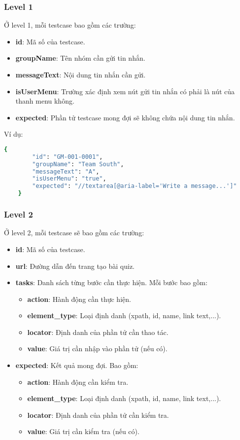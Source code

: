 \subsubsection{Level 1}
Ở level 1, mỗi testcase bao gồm các trường:
\begin{itemize}
    \item \textbf{id}: Mã số của testcase.
    \item \textbf{groupName}: Tên nhóm cần gửi tin nhắn.
    \item \textbf{messageText}: Nội dung tin nhắn cần gửi.
    \item \textbf{isUserMenu}: Trường xác định xem nút gửi tin nhắn có phải là nút của thanh menu không.
    \item \textbf{expected}: Phần tử testcase mong đợi sẽ không chứa nội dung tin nhắn.
\end{itemize}

Ví dụ:
\begin{lstlisting}[language=bash, caption={Ví dụ testcase GM-001-0001 ở level 1}, breaklines=true]
    {
        "id": "GM-001-0001",
        "groupName": "Team South",
        "messageText": "A",
        "isUserMenu": "true",
        "expected": "//textarea[@aria-label='Write a message...']"
    }
\end{lstlisting}

\subsubsection{Level 2}

Ở level 2, mỗi testcase sẽ bao gồm các trường:
\begin{itemize}
    \item \textbf{id}: Mã số của testcase.
    \item \textbf{url}: Đường dẫn đến trang tạo bài quiz.
    \item \textbf{tasks}: Danh sách từng bước cần thực hiện. Mỗi bước bao gồm:
\begin{itemize}
    \item \textbf{action}: Hành động cần thực hiện.
    \item \textbf{element\_type}: Loại định danh (xpath, id, name, link text,...).
    \item \textbf{locator}: Định danh của phần tử cần thao tác.
    \item \textbf{value}: Giá trị cần nhập vào phần tử (nếu có).
\end{itemize}
    \item \textbf{expected}: Kết quả mong đợi. Bao gồm:
\begin{itemize}
    \item \textbf{action}: Hành động cần kiểm tra.
    \item \textbf{element\_type}: Loại định danh (xpath, id, name, link text,...).
    \item \textbf{locator}: Định danh của phần tử cần kiểm tra.
    \item \textbf{value}: Giá trị cần kiểm tra (nếu có).
\end{itemize}
\end{itemize}

